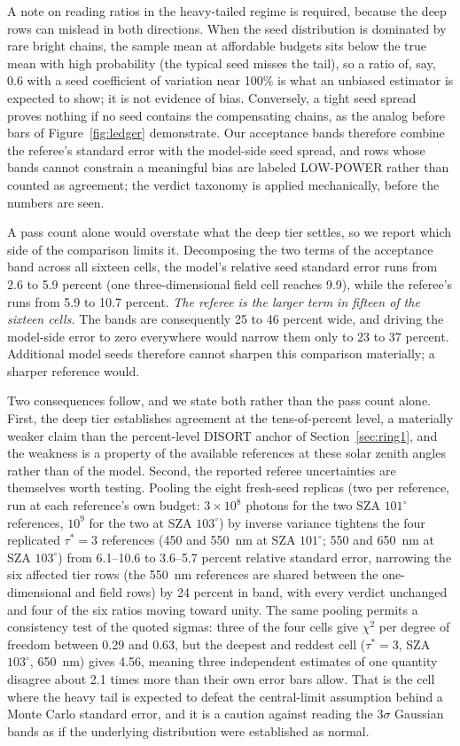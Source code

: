 \documentclass[preprint,12pt]{elsarticle}
\begin{document}
A note on reading ratios in the heavy-tailed regime is required,
because the deep rows can mislead in both directions. When the seed
distribution is dominated by rare bright chains, the sample mean at
affordable budgets sits below the true mean with high probability
(the typical seed misses the tail), so a ratio of, say, 0.6 with a
seed coefficient of variation near 100\% is what an unbiased
estimator is expected to show; it is not evidence of bias. Conversely,
a tight seed spread proves nothing if no seed contains the
compensating chains, as the analog before bars of
Figure~\ref{fig:ledger} demonstrate. Our acceptance bands therefore combine the referee's
standard error with the model-side seed spread, and rows whose bands
cannot constrain a meaningful bias are labeled LOW-POWER rather than
counted as agreement; the verdict taxonomy is applied mechanically,
before the numbers are seen.

A pass count alone would overstate what the deep tier settles, so we
report which side of the comparison limits it. Decomposing the two
terms of the acceptance band across all sixteen cells, the model's
relative seed standard error runs from 2.6 to 5.9 percent (one
three-dimensional field cell reaches 9.9), while the referee's runs
from 5.9 to 10.7 percent. \emph{The referee is the larger term in
fifteen of the sixteen cells.} The bands are consequently 25 to 46
percent wide, and driving the model-side error to zero everywhere
would narrow them only to 23 to 37 percent. Additional model seeds
therefore cannot sharpen this comparison materially; a sharper
reference would.

Two consequences follow, and we state both rather than the pass count
alone. First, the deep tier establishes agreement at the
tens-of-percent level, a materially weaker claim than the
percent-level DISORT anchor of Section~\ref{sec:ring1}, and the
weakness is a property of the available references at these solar
zenith angles rather than of the model. Second, the reported referee
uncertainties are themselves worth testing. Pooling the eight
fresh-seed replicas (two per reference, run at each reference's own
budget: $3\times10^{8}$ photons for the two SZA $101^\circ$
references, $10^{9}$ for the two at SZA $103^\circ$) by inverse
variance tightens the four replicated $\tau^{*}=3$ references (450 and
550~nm at SZA $101^\circ$; 550 and 650~nm at SZA $103^\circ$) from
6.1--10.6 to 3.6--5.7 percent relative standard error, narrowing the
six affected tier rows (the 550~nm references are shared between the
one-dimensional and field rows) by 24 percent in band, with every
verdict unchanged and four of the six ratios moving toward unity. The same pooling permits a
consistency test of the quoted sigmas: three of the four cells give
$\chi^2$ per degree of freedom between 0.29 and 0.63, but the deepest
and reddest cell ($\tau^{*}=3$, SZA $103^\circ$, 650~nm) gives 4.56,
meaning three independent estimates of one quantity disagree about
2.1 times more than their own error bars allow. That is
the cell where the heavy tail is expected to defeat the central-limit
assumption behind a Monte Carlo standard error, and it is a caution
against reading the $3\sigma$ Gaussian bands as if the underlying
distribution were established as normal.
\end{document}
